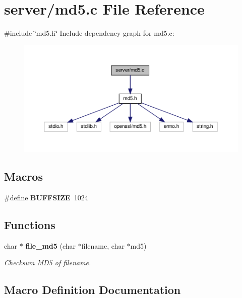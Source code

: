 \section{server/md5.c File Reference}
\label{md5_8c}
{\ttfamily \#include \char`\"{}md5.\+h\char`\"{}}\newline
Include dependency graph for md5.\+c\+:\nopagebreak
\begin{figure}[H]
\begin{center}
\leavevmode
\includegraphics[width=350pt]{md5_8c__incl}
\end{center}
\end{figure}
\subsection*{Macros}
\begin{DoxyCompactItemize}
\item 
\#define \textbf{ B\+U\+F\+F\+S\+I\+ZE}~1024
\end{DoxyCompactItemize}
\subsection*{Functions}
\begin{DoxyCompactItemize}
\item 
char $\ast$ \textbf{ file\+\_\+md5} (char $\ast$filename, char $\ast$md5)
\begin{DoxyCompactList}\small\item\em Checksum M\+D5 of filename. \end{DoxyCompactList}\end{DoxyCompactItemize}


\subsection{Macro Definition Documentation}
\mbox{\label{md5_8c_a39912bfe2a55f30e269196f9141d845d}} 

